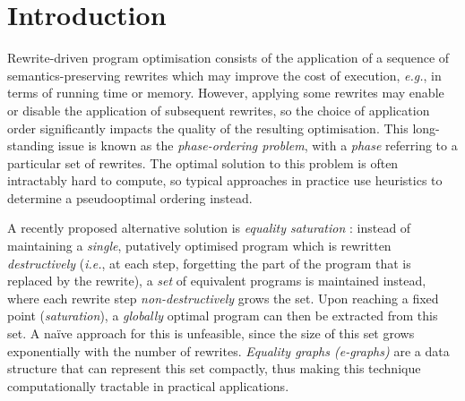 
\section{Introduction}\label{sec:introduction}


Rewrite-driven program optimisation consists of the application of a sequence of semantics-preserving rewrites which may improve the cost of execution, \emph{e.g.}, in terms of running time or memory.
However, applying some rewrites may enable or disable the application of subsequent rewrites, so the choice of application order significantly impacts the quality of the resulting optimisation.  
This long-standing issue is known as the \textit{phase-ordering problem}, with a \textit{phase} referring to a particular set of rewrites.
The optimal solution to this problem is often intractably hard to compute, so typical approaches in practice use heuristics to determine a pseudooptimal ordering instead.

A recently proposed alternative solution is \textit{equality saturation} 
\cite{10.1145/1594834.1480915}: instead of maintaining a \textit{single},  putatively optimised program which is rewritten \textit{destructively} (\textit{i.e.}, at each step, forgetting the part of the program that is replaced by the rewrite), a \textit{set} of equivalent programs is maintained instead, where each rewrite step \textit{non-destructively} grows the set.  
Upon reaching a fixed point (\textit{saturation}),  a \textit{globally} optimal program can then be extracted from this set.
A na\"ive approach for this is unfeasible, since the size of this set grows exponentially with the number of rewrites. 
\textit{Equality graphs (e-graphs)} \cite{EggPaper} are a data structure that can represent this set compactly, thus making this technique computationally tractable in practical applications.

